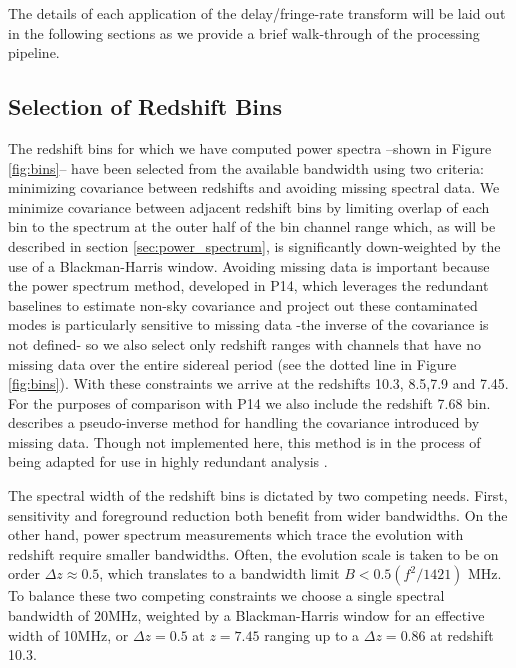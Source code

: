 \documentclass[preprint2]{aastex}
\begin{document}
 The details of each application of the delay/fringe-rate transform will be laid out in the following sections as we provide a brief walk-through of the processing pipeline. 


\subsection{Selection of Redshift Bins}
The redshift bins for which we have computed power spectra --shown in Figure \ref{fig:bins}-- have been selected from the available bandwidth using two criteria: minimizing covariance between redshifts and avoiding missing spectral data. We minimize covariance between adjacent redshift bins by limiting overlap of each bin to the spectrum at the outer half of the bin channel range which, as will be described in section \ref{sec:power_spectrum}, is significantly down-weighted by the use of a Blackman-Harris window.   Avoiding missing data is important because the power spectrum method, developed in P14, which leverages the redundant baselines to estimate non-sky covariance and project out these contaminated modes is particularly sensitive to missing data -the inverse of the covariance is not defined- so we also select only redshift ranges with channels that have no missing data over the entire sidereal period (see the dotted line in Figure \ref{fig:bins}).  With these constraints we arrive at the redshifts 10.3, 8.5,7.9 and 7.45.  For the purposes of comparison with P14 we also include the redshift 7.68 bin.  \citet{Dillon:2013p10497} describes a pseudo-inverse method for handling the covariance introduced by missing data. Though not implemented here, this method is in the process of being adapted for use in highly redundant analysis \citep{PhysRevD.90.023018,PhysRevD.90.023019}.  

The spectral width of the redshift bins is dictated by two competing needs. First, sensitivity and foreground reduction both benefit from wider bandwidths. On the other hand, power spectrum measurements which trace the evolution with redshift require smaller bandwidths. Often, the evolution scale is taken to be on order $\Delta z \approx 0.5$, which translates to a bandwidth limit $B<0.5 (f^2/1421)$ MHz. To balance these two competing constraints we choose a single spectral bandwidth of 20MHz, weighted by a Blackman-Harris window for an effective width of 10MHz, or $\Delta z=0.5$ at $z=7.45$ ranging up to a $\Delta z = 0.86$ at redshift 10.3.
\end{document}
